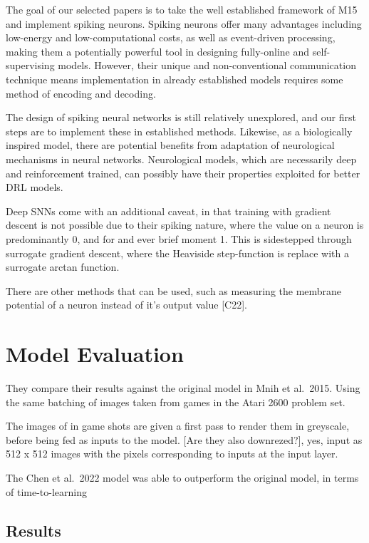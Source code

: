 The goal of our selected papers is to take the well established
framework of M15 and implement spiking neurons. Spiking neurons offer
many advantages including low-energy and low-computational costs, as
well as event-driven processing, making them a potentially powerful tool
in designing fully-online and self-supervising models. However, their
unique and non-conventional communication technique means implementation
in already established models requires some method of encoding and
decoding.

The design of spiking neural networks is still relatively unexplored,
and our first steps are to implement these in established methods.
Likewise, as a biologically inspired model, there are potential benefits
from adaptation of neurological mechanisms in neural networks.
Neurological models, which are necessarily deep and reinforcement
trained, can possibly have their properties exploited for better DRL
models.

Deep SNNs come with an additional caveat, in that training with gradient
descent is not possible due to their spiking nature, where the value on
a neuron is predominantly 0, and for and ever brief moment 1. This is
sidestepped through surrogate gradient descent, where the Heaviside
step-function is replace with a surrogate arctan function.

There are other methods that can be used, such as measuring the membrane
potential of a neuron instead of it's output value {[}C22{]}.

\hypertarget{model-evaluation}{%
\section{Model Evaluation}\label{model-evaluation}}

They compare their results against the original model in Mnih et
al.~2015. Using the same batching of images taken from games in the
Atari 2600 problem set.

The images of in game shots are given a first pass to render them in
greyscale, before being fed as inputs to the model. {[}Are they also
downrezed?{]}, yes, input as 512 x 512 images with the pixels
corresponding to inputs at the input layer.

The Chen et al.~2022 model was able to outperform the original model, in
terms of time-to-learning

\hypertarget{results}{%
\subsection{Results}\label{results}}

